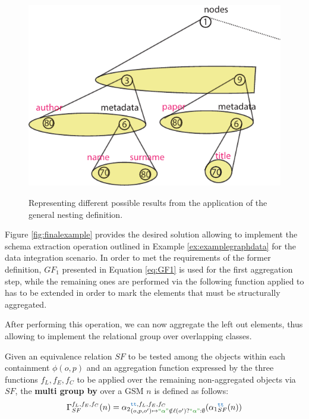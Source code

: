 \begin{figure}[!t]
	\ContinuedFloat
	\centering
	\begin{minipage}[t]{0.5\textwidth}
		\centering
		\includegraphics[scale=0.8]{fig/05language/13actual_schema.pdf}
		\label{fig:finalexample}
	\end{minipage}
	\caption{Representing different possible results from the application of the general nesting definition.}
\end{figure}
\begin{example}[continues=ex:aggregations2]
Figure \vref{fig:finalexample} provides the desired solution allowing to implement the schema extraction operation outlined in Example \vref{ex:examplegraphdata} for the data integration scenario.
In order to met the requirements of the former definition, $GF_1$ presented in Equation \vref{eq:GF1} is used for the first aggregation step, while the remaining ones are performed via the following function applied to has to be extended in order to mark the elements that must be structurally aggregated.
\end{example}

After performing this operation, we can now aggregate the left out elements, thus allowing to implement the relational group over overlapping classes.

\begin{definition}
Given an equivalence relation $SF$ to be tested among the objects within each containment $\phi(o,p)$ and an aggregation function expressed by the three functions $f_L,f_E,f_C$ to be applied over the remaining non-aggregated objects via $SF$, the \textbf{multi group by} over a GSM $n$ is defined as follows:
	\[\Gamma_{SF}^{f_L,f_E,f_C}(n)={\alpha_2}_{(o,p,o')\mapsto {\color{webgreen}\textup{``}\alpha\textup{''}}\notin\ell(o')?{\color{webgreen}\textup{``}\alpha\textup{''}}:\emptyset}^{\texttt{\color{RoyalBlue}tt},f_L,f_E,f_C}({\alpha_1}_{SF}^{{\color{RoyalBlue}\texttt{tt}}}(n))\]
\end{definition}



